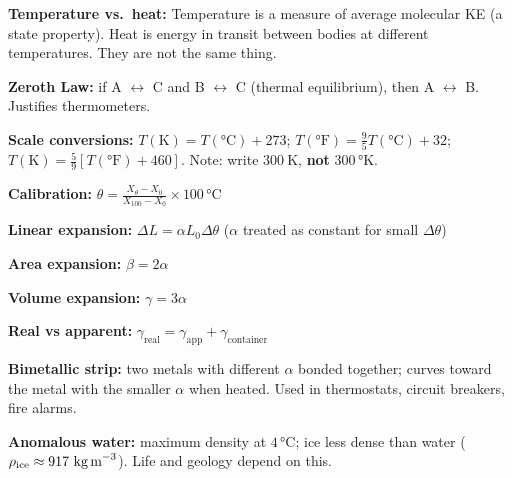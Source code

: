 \begin{summarybox}
\textbf{Temperature vs.\ heat:} Temperature is a measure
of average molecular KE (a state property). Heat is
energy in transit between bodies at different
temperatures. They are not the same thing.

\textbf{Zeroth Law:} if A $\leftrightarrow$ C and
B $\leftrightarrow$ C (thermal equilibrium), then
A $\leftrightarrow$ B. Justifies thermometers.

\textbf{Scale conversions:}
$T(\text{K}) = T(°\text{C}) + 273$;
$T(°\text{F}) = \frac{9}{5}T(°\text{C}) + 32$;
$T(\text{K}) = \frac{5}{9}[T(°\text{F}) + 460]$.
Note: write $300\ \text{K}$, \textbf{not}
$300\,°\text{K}$.

\textbf{Calibration:}
$\theta = \frac{X_\theta - X_0}{X_{100}-X_0}
\times 100\,°\text{C}$

\textbf{Linear expansion:}
$\Delta L = \alpha L_0\Delta\theta$
($\alpha$ treated as constant for small $\Delta\theta$)

\textbf{Area expansion:}
$\beta = 2\alpha$

\textbf{Volume expansion:}
$\gamma = 3\alpha$

\textbf{Real vs apparent:}
$\gamma_{\text{real}} = \gamma_{\text{app}}
+ \gamma_{\text{container}}$

\textbf{Bimetallic strip:} two metals with different
$\alpha$ bonded together; curves toward the metal
with the smaller $\alpha$ when heated.
Used in thermostats, circuit breakers, fire alarms.

\textbf{Anomalous water:} maximum density at
$4\,°\text{C}$; ice less dense than water ($\rho_{\text{ice}}
\approx 917\ \text{kg\,m}^{-3}$). Life and geology
depend on this.
\end{summarybox}

